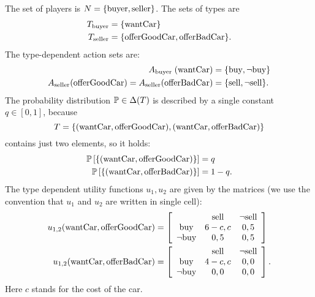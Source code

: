 \documentclass{scrartcl}
\begin{document}
The set of players is $N = \set{\textrm{buyer}, \textrm{seller}}$.
The sets of types are 
\begin{align*}
  T_{\textrm{buyer}} &= \set{ \textrm{wantCar}} \\
  T_{\textrm{seller}} &= \set{\textrm{offerGoodCar}, \textrm{offerBadCar}}.
\end{align*}
The type-dependent action sets are:
\begin{align*}
  A_{\textrm{buyer }}(\textrm{wantCar}) &= \set{\textrm{buy},\neg \textrm{buy}} \\
  A_{\textrm{seller}}(\textrm{offerGoodCar}) = A_{\textrm{seller}}(\textrm{offerBadCar}) &= \set{\textrm{sell}, \neg \textrm{sell}}.
\end{align*}
The probability distribution $\P \in \Delta(T)$ is described by a single 
constant $q\in [0, 1]$, because 
\[
  T = \set{
    (\textrm{wantCar}, \textrm{offerGoodCar}), 
    (\textrm{wantCar}, \textrm{offerBadCar})}
\]
contains just two elements, so it holds:
\begin{align*}
  \P\sPar{\set{(\textrm{wantCar}, \textrm{offerGoodCar})}} &= q \\
  \P\sPar{\set{(\textrm{wantCar}, \textrm{offerBadCar})}} &= 1 - q.
\end{align*}
The type dependent utility functions $u_1, u_2$ are given by the matrices
(we use the convention that $u_1$ and $u_2$ are written in single cell):
\begin{align*}
  u_{1,2}(\textrm{wantCar}, \textrm{offerGoodCar}) &= \mat{ccc}{
                      & \textrm{sell}   & \neg \textrm{sell} \\
    \textrm{buy}      & 6-c, c & 0, 5 \\
    \neg \textrm{buy} & 0,5    & 0, 5
  }
  \\
  u_{1,2}(\textrm{wantCar}, \textrm{offerBadCar}) &= \mat{ccc}{
             & \textrm{sell}   & \neg \textrm{sell} \\
    \textrm{buy}      & 4-c, c & 0, 0 \\
    \neg \textrm{buy} & 0,0    & 0, 0
  }.
\end{align*}
Here $c$ stands for the cost of the car.
\end{document}
